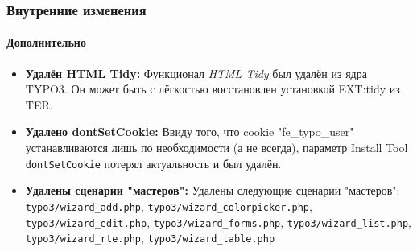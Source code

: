 \begin{frame}[fragile]
	\frametitle{Внутренние изменения}
	\framesubtitle{Дополнительно}

	\begin{itemize}

		\item \textbf{Удалён HTML Tidy:}\newline
			\small
				Функционал \textit{HTML Tidy} был удалён из ядра TYPO3. Он может быть с лёгкостью восстановлен установкой
				EXT:tidy из TER.
			\normalsize

		\item \textbf{Удалено dontSetCookie:}\newline
			\small
				Ввиду того, что cookie "fe\_typo\_user" устанавливаются лишь по необходимости (а не всегда), параметр Install Tool \texttt{dontSetCookie} потерял актуальность и был удалён.
			\normalsize

		\item \textbf{Удалены сценарии "мастеров":}\newline
			\small
				Удалены следующие сценарии "мастеров":
				\texttt{typo3/wizard\_add.php}, \texttt{typo3/wizard\_colorpicker.php}, \texttt{typo3/wizard\_edit.php}, \texttt{typo3/wizard\_forms.php}, \texttt{typo3/wizard\_list.php}, \texttt{typo3/wizard\_rte.php}, \texttt{typo3/wizard\_table.php}
			\normalsize

	\end{itemize}
	
\end{frame}


